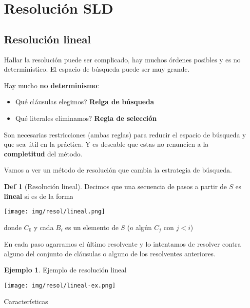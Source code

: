 \documentclass{report}
\theoremstyle{definition} %
\newtheorem*{definition*}{Def}
\newtheorem*{example*}{Ejemplo}
\begin{document}
\section{Resolución SLD}

\subsection{Resolución lineal}

Hallar la resolución puede ser complicado, hay muchos órdenes posibles y es no
determinístico. El espacio de búsqueda puede ser muy grande.

Hay mucho \textbf{no determinismo}:
\begin{itemize}
    \item Qué cláusulas elegimos? \textbf{Relga de búsqueda}
    \item Qué literales eliminamos? \textbf{Regla de selección}
\end{itemize}

Son necesarias restricciones (ambas reglas) para reducir el espacio de búsqueda
y que sea útil en la práctica. Y es deseable que estas no renuncien a la
\textbf{completitud} del método.

Vamos a ver un método de resolución que cambia la estrategia de búsqueda.

\begin{definition*}[Resolución lineal]
    Decimos que una secuencia de pasos a partir de $S$ es \textbf{lineal} si es
    de la forma

    \begin{center}
        \texttt{[image: img/resol/lineal.png]}
    \end{center}

    donde $C_0$ y cada $B_i$ es un elemento de $S$ (o algún $C_j$ con $j < i$)

    En cada paso agarramos el último resolvente y lo intentamos de resolver
    contra alguno del conjunto de cláusulas o alguno de los resolventes
    anteriores.
\end{definition*}

\begin{example*}Ejemplo de resolución lineal
    \begin{center}
        \texttt{[image: img/resol/lineal-ex.png]}
    \end{center}
\end{example*}

Características
\end{document}
